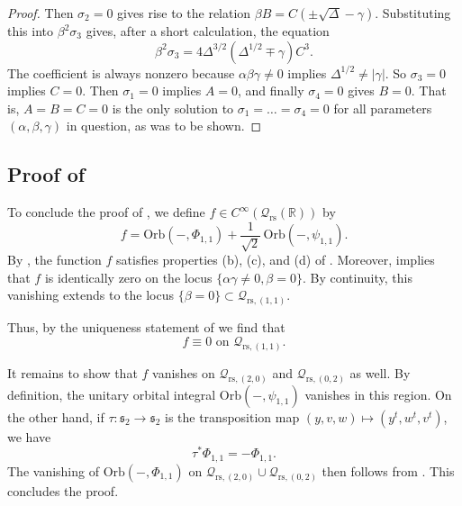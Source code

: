 \documentclass[reqno, 11pt]{amsart} %
\numberwithin{equation}{section}
\theoremstyle{plain}
\theoremstyle{definition}
\theoremstyle{remark}
\newcommand{\mr}{\mathrm}
\newcommand{\rs}{\mr{rs}}
\newcommand{\bbR}{\mathbb R}
\newcommand{\calQ}{\mathcal Q}
\newcommand{\lie}[1]{ \mathfrak{#1}}
\newcommand{\Orb}{\mathrm{Orb}}
\begin{document}
\begin{proof}
Then $σ_2 = 0$ gives rise to the relation $βB = C( \pm \sqrt{Δ}-γ)$. Substituting this into $β^2σ_3$ gives,  after a short calculation, the equation
\begin{equation}
β^2σ_3 = 4Δ^{3/2}(Δ^{1/2}  \mp γ)C^3.
\end{equation}
The coefficient is always nonzero because $αβγ \neq 0$ implies $Δ^{1/2} \neq |γ|$. So $σ_3 = 0$ implies $C = 0$. Then $σ_1 = 0$ implies $A = 0$, and finally $σ_4 = 0$ gives $B = 0$. That is, $A = B = C = 0$ is the only solution to $σ_1 = \ldots = σ_4 = 0$ for all parameters $(α, β, γ)$ in question, as was to be shown.


\end{proof}

\subsection{Proof of } \label{ss:proof main thm 11}
To conclude the proof of , we define $f \in C^{\infty}(\calQ_\rs(\bbR))$ by
\[
f = \Orb(-,\Phi_{1,1}) +  \frac1{\sqrt 2} \, \Orb(- , \psi_{1,1}).
\]
By , the function $f$ satisfies properties (b), (c), and (d) of . Moreover,  implies that $f$ is identically zero on the locus $\{ \alpha \gamma \neq 0, \beta = 0\}$. By continuity, this vanishing extends to the locus $\{\beta = 0\} \subset \mathcal Q_{\rs,(1,1)}$.

Thus, by the uniqueness statement of   we find that
\[  f \equiv 0 \text{ on } \mathcal Q_{\rs,(1,1)}.\]

It remains to show that $f$ vanishes on $\mathcal Q_{\rs,(2,0)}$ and $\mathcal Q_{\rs,(0,2)}$ as well.  By definition, the unitary orbital integral $\Orb(-, \psi_{1,1})$ vanishes in this region. On the other hand, if $\tau \colon \lie s_2 \to \lie s_2$ is the transposition map $(y,v,w) \mapsto (y^t, w^t, v^t)$, we have
\[
\tau^* \Phi_{1,1} = - \Phi_{1,1}.
\]
The vanishing of $\Orb(-,\Phi_{1,1})$ on $\calQ_{\rs, (2,0)} \cup \calQ_{\rs, (0,2)}$ then follows from .  This concludes the proof.
\end{document}
